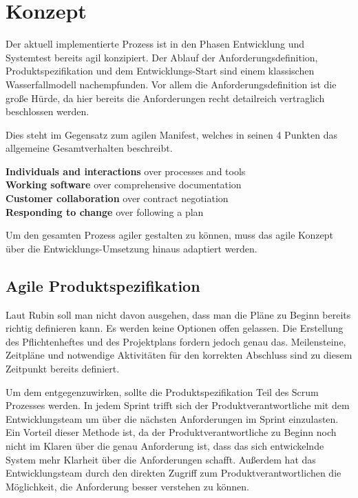 \chapter{Konzept}\label{chap:concept}
\chapterstart

Der aktuell implementierte Prozess ist in den Phasen Entwicklung und Systemtest bereits agil konzipiert. 
Der Ablauf der Anforderungsdefinition, Produktspezifikation und dem Entwicklungs-Start sind einem klassischen Wasserfallmodell nachempfunden. Vor allem die Anforderungsdefinition ist die große Hürde, da hier bereits die Anforderungen recht detailreich vertraglich beschlossen werden.

Dies steht im Gegensatz zum agilen Manifest, welches in seinen 4 Punkten das allgemeine Gesamtverhalten beschreibt. 

\textbf{Individuals and interactions} over processes and tools \\
\textbf{Working software} over comprehensive documentation \\
\textbf{Customer collaboration} over contract negotiation \\
\textbf{Responding to change} over following a plan \\ \parencite{Beck:2001}

Um den gesamten Prozess agiler gestalten zu können, muss das agile Konzept über die Entwicklungs-Umsetzung hinaus adaptiert werden. 

\section{Agile Produktspezifikation}

Laut Rubin soll man nicht davon ausgehen, dass man die Pläne zu Beginn bereits richtig definieren kann. Es werden keine Optionen offen gelassen. \parencite[vgl.][S. 248, 249]{Rubin:2012} Die Erstellung des Pflichtenheftes und des Projektplans fordern jedoch genau das. Meilensteine, Zeitpläne und notwendige Aktivitäten für den korrekten Abschluss sind zu diesem Zeitpunkt bereits definiert.

Um dem entgegenzuwirken, sollte die Produktspezifikation Teil des Scrum Prozesses werden. In jedem Sprint trifft sich der Produktverantwortliche mit dem Entwicklungsteam um über die nächsten Anforderungen im Sprint einzulasten. Ein Vorteil dieser Methode ist, da der Produktverantwortliche zu Beginn noch nicht im Klaren über die genau Anforderung ist, dass das sich entwickelnde System mehr Klarheit über die Anforderungen schafft. Außerdem hat das Entwicklungsteam durch den direkten Zugriff zum Produktverantwortlichen die Möglichkeit, die Anforderung besser verstehen zu können. \parencite[vgl.][S. 27]{Ramadan:2016}

